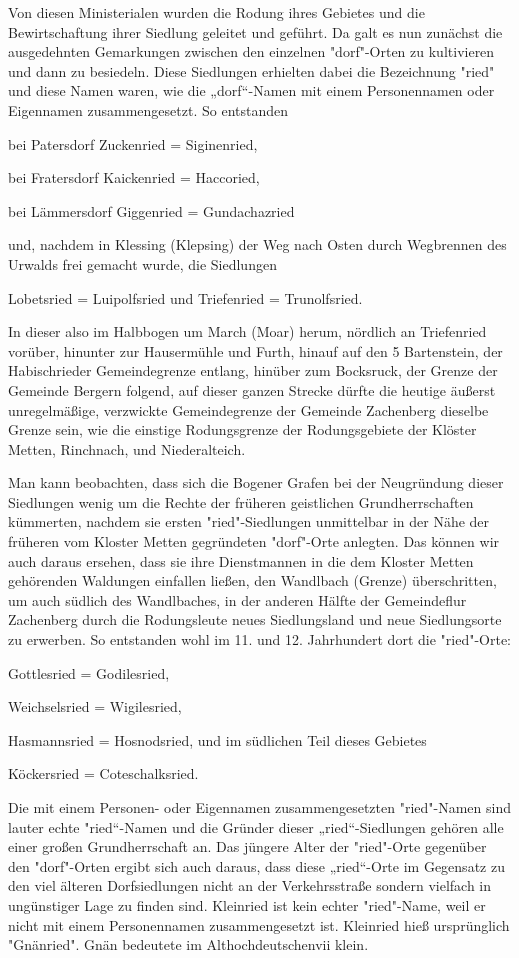 Von diesen Ministerialen wurden die Rodung ihres Gebietes und die
Bewirtschaftung ihrer Siedlung geleitet und geführt. Da galt es nun zunächst die
ausgedehnten Gemarkungen zwischen den einzelnen "dorf"-Orten zu kultivieren und
dann zu besiedeln. Diese Siedlungen erhielten dabei die Bezeichnung "ried" und
diese Namen waren, wie die „dorf“-Namen mit einem Personennamen oder Eigennamen
zusammengesetzt. So entstanden

bei Patersdorf Zuckenried = Siginenried,

bei Fratersdorf Kaickenried = Haccoried,

bei Lämmersdorf Giggenried = Gundachazried

und, nachdem in Klessing (Klepsing) der Weg nach Osten durch Wegbrennen des
Urwalds frei gemacht wurde, die Siedlungen

Lobetsried = Luipolfsried und Triefenried = Trunolfsried.

In dieser also im Halbbogen um March (Moar) herum, nördlich an Triefenried
vorüber, hinunter zur Hausermühle und Furth, hinauf auf den 5 Bartenstein, der
Habischrieder Gemeindegrenze entlang, hinüber zum Bocksruck, der Grenze der
Gemeinde Bergern folgend, auf dieser ganzen Strecke dürfte die heutige äußerst
unregelmäßige, verzwickte Gemeindegrenze der Gemeinde Zachenberg dieselbe Grenze
sein, wie die einstige Rodungsgrenze der Rodungsgebiete der Klöster Metten,
Rinchnach, und Niederalteich.

Man kann beobachten, dass sich die Bogener Grafen bei der Neugründung dieser
Siedlungen wenig um die Rechte der früheren geistlichen Grundherrschaften
kümmerten, nachdem sie ersten "ried"-Siedlungen unmittelbar in der Nähe der
früheren vom Kloster Metten gegründeten "dorf"-Orte anlegten. Das können wir
auch daraus ersehen, dass sie ihre Dienstmannen in die dem Kloster Metten
gehörenden Waldungen einfallen ließen, den Wandlbach (Grenze) überschritten, um
auch südlich des Wandlbaches, in der anderen Hälfte der Gemeindeflur Zachenberg
durch die Rodungsleute neues Siedlungsland und neue Siedlungsorte zu erwerben.
So entstanden wohl im 11. und 12. Jahrhundert dort die "ried"-Orte:

Gottlesried = Godilesried,

Weichselsried = Wigilesried,

Hasmannsried = Hosnodsried, und im südlichen Teil dieses Gebietes

Köckersried = Coteschalksried.

Die mit einem Personen- oder Eigennamen zusammengesetzten "ried"-Namen sind
lauter echte "ried“-Namen und die Gründer dieser „ried“-Siedlungen gehören alle
einer großen Grundherrschaft an. Das jüngere Alter der "ried"-Orte gegenüber den
"dorf"-Orten ergibt sich auch daraus, dass diese „ried“-Orte im Gegensatz zu den
viel älteren Dorfsiedlungen nicht an der Verkehrsstraße sondern vielfach in
ungünstiger Lage zu finden sind. Kleinried ist kein echter "ried"-Name, weil er
nicht mit einem Personennamen zusammengesetzt ist. Kleinried hieß ursprünglich
"Gnänried". Gnän bedeutete im Althochdeutschenvii klein.

